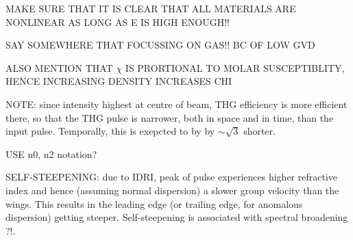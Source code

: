 \documentclass[a4paper]{jpconf}
\begin{document}
MAKE SURE THAT IT IS CLEAR THAT ALL MATERIALS ARE NONLINEAR AS LONG AS E IS HIGH ENOUGH!!

SAY SOMEWHERE THAT FOCUSSING ON GAS!! BC OF LOW GVD 


ALSO MENTION THAT $\chi$ IS PRORTIONAL TO MOLAR SUSCEPTIBLITY, HENCE INCREASING DENSITY INCREASES CHI


NOTE: since intensity highest at centre of beam, THG efficiency is more efficient there, so that the THG pulse is narrower, both in space and in time, than the input pulse. Temporally, this is exepcted to by by $\sim \sqrt{3}$ shorter. 


USE n0, n2 notation?


SELF-STEEPENING: due to IDRI, peak of pulse experiences higher refractive index and hence (assuming normal dispersion) a slower group velocity than the wings. This results in the leading edge (or trailing edge, for anomalous dispersion) getting steeper. Self-steepening is associated with spectral broadening ?!. 
\end{document}
